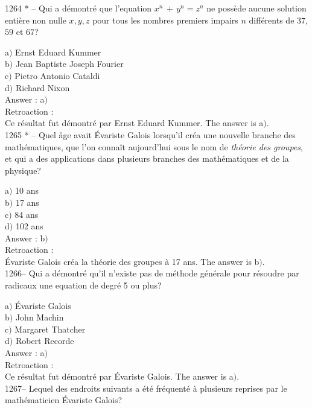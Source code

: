 ﻿\documentclass[letterpaper, 12pt]{article}
\begin{document}
1264 * -- Qui a d\'emontr\'e que l'equation $x^n\,+\,y^n=z^n$ ne
poss\`ede aucune solution enti\`ere non nulle $x,y,z$ pour tous les
nombres premiers impairs $n$ diff\'erents de $37$, $59$ et $67$?

a$)$ Ernst Eduard Kummer \\
b$)$ Jean Baptiste Joseph Fourier \\
c$)$ Pietro Antonio Cataldi \\
d$)$ Richard Nixon\\

Answer : a$)$\\

Retroaction : \\
Ce r\'esultat fut d\'emontr\'e par Ernst Eduard Kummer.
The answer is a$)$.\\

1265 * -- Quel \^age avait \'Evariste Galois lorsqu'il cr\'ea une
nouvelle branche des math\'ematiques, que l'on conna\^it aujourd'hui
sous le nom de {\sl th\'eorie des groupes}, et qui a des
applications dans plusieurs branches des math\'ematiques et de la
physique?

a$)$ 10 ans \\
b$)$ 17 ans \\
c$)$ 84 ans \\
d$)$ 102 ans\\

Answer : b$)$\\

Retroaction : \\
\'Evariste Galois cr\'ea la th\'eorie des groupes \`a 17 ans.
The answer is b$)$.\\

1266-- Qui a d\'emontr\'e qu'il n'existe pas de m\'ethode
g\'en\'erale pour r\'esoudre par radicaux une equation de degr\'e
5 ou plus?

a$)$ \'Evariste Galois \\
b$)$ John Machin \\
c$)$ Margaret Thatcher \\
d$)$ Robert Recorde\\

Answer : a$)$\\

Retroaction : \\
Ce r\'esultat fut d\'emontr\'e par \'Evariste Galois.
The answer is a$)$.\\

1267-- Lequel des endroits suivants a \'et\'e fr\'equent\'e \`a
plusieurs reprises par le math\'ematicien \'Evariste Galois?
\end{document}
